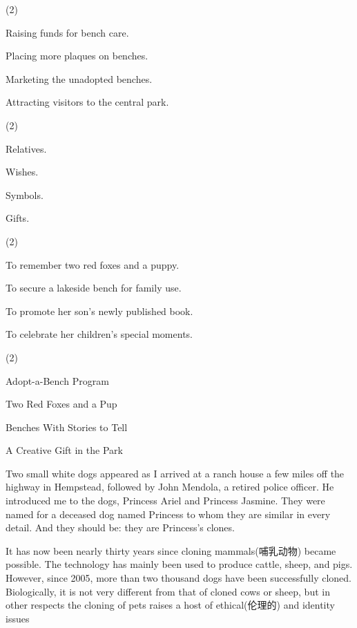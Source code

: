 \documentclass{英语试卷}
\begin{document}
\begin{choices}(2)
  \item Raising funds for bench care.
  \item Placing more plaques on benches.
  \item Marketing the unadopted benches.
  \item Attracting visitors to the central park.
\end{choices}
\begin{choices}(2)
  \item Relatives.
  \item Wishes.
  \item Symbols.
  \item Gifts.
\end{choices}
\begin{choices}(2)
  \item To remember two red foxes and a puppy.
  \item To secure a lakeside bench for family use.
  \item To promote her son's newly published book.
  \item To celebrate her children's special moments.
\end{choices}
\begin{choices}(2)
  \item Adopt-a-Bench Program
  \item Two Red Foxes and a Pup
  \item Benches With Stories to Tell
  \item A Creative Gift in the Park
\end{choices}
\par Two small white dogs appeared as I arrived at a ranch house a few miles off the highway in Hempstead, followed by John Mendola, a retired police officer. He introduced me to the dogs, Princess Ariel and Princess Jasmine. They were named for a deceased dog named Princess to whom they are similar in every detail. And they should be: they are Princess's clones.\par
\par It has now been nearly thirty years since cloning mammals(哺乳动物) became possible. The technology has mainly been used to produce cattle, sheep, and pigs. However, since 2005, more than two thousand dogs have been successfully cloned. Biologically, it is not very different from that of cloned cows or sheep, but in other respects the cloning of pets raises a host of ethical(伦理的) and identity issues\par
\end{document}
